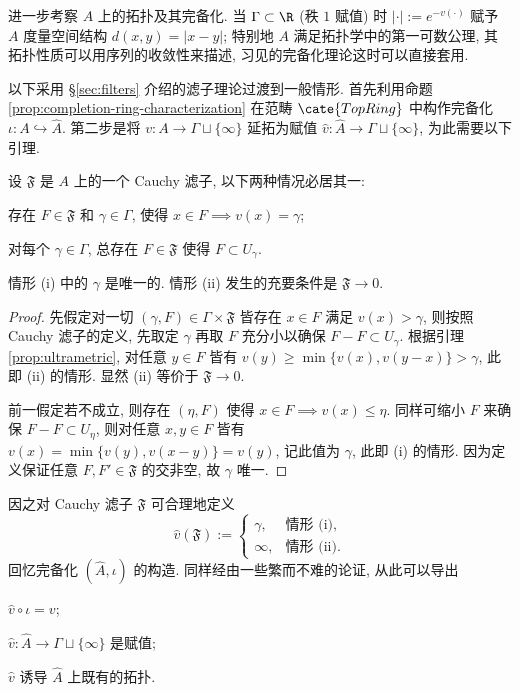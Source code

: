 进一步考察 $A$ 上的拓扑及其完备化. 当 $\Gamma \subset \R$ (秩 $1$ 赋值) 时 $|\cdot| := e^{-v(\cdot)}$ 赋予 $A$ 度量空间结构 $d(x,y) = |x-y|$; 特别地 $A$ 满足拓扑学中的第一可数公理, 其拓扑性质可以用序列的收敛性来描述, 习见的完备化理论这时可以直接套用.

以下采用 \S\ref{sec:filters} 介绍的滤子理论过渡到一般情形. 首先利用命题 \ref{prop:completion-ring-characterization} 在范畴 $\cate{TopRing}$ 中构作完备化 $\iota: A \hookrightarrow \hat{A}$. 第二步是将 $v: A \to \Gamma \sqcup \{\infty\}$ 延拓为赋值 $\hat{v}: \hat{A} \to \Gamma \sqcup \{\infty\}$, 为此需要以下引理.

\begin{lemma}\label{prop:valuation-of-Cauchy-filter}
	设 $\mathfrak{F}$ 是 $A$ 上的一个 Cauchy 滤子, 以下两种情况必居其一:
	\begin{compactenum}[(i)]
		\item 存在 $F \in \mathfrak{F}$ 和 $\gamma \in \Gamma$, 使得 $x \in F \implies v(x) = \gamma$;
		\item 对每个 $\gamma \in \Gamma$, 总存在 $F \in \mathfrak{F}$ 使得 $F \subset U_\gamma$.
	\end{compactenum}
	情形 (i) 中的 $\gamma$ 是唯一的. 情形 (ii) 发生的充要条件是 $\mathfrak{F} \to 0$.
\end{lemma}
\begin{proof}
	先假定对一切 $(\gamma, F) \in \Gamma \times \mathfrak{F}$ 皆存在 $x \in F$ 满足 $v(x) > \gamma$, 则按照 Cauchy 滤子的定义, 先取定 $\gamma$ 再取 $F$ 充分小以确保 $F-F \subset U_\gamma$. 根据引理 \ref{prop:ultrametric}, 对任意 $y \in F$ 皆有 $v(y) \geq \min\{v(x), v(y-x) \} > \gamma$, 此即 (ii) 的情形. 显然 (ii) 等价于 $\mathfrak{F} \to 0$.

	前一假定若不成立, 则存在 $(\eta, F)$ 使得 $x \in F \implies v(x) \leq \eta$. 同样可缩小 $F$ 来确保 $F-F \subset U_\eta$, 则对任意 $x,y \in F$ 皆有 $v(x) = \min\{v(y), v(x-y) \} = v(y)$, 记此值为 $\gamma$, 此即 (i) 的情形. 因为定义保证任意 $F, F' \in \mathfrak{F}$ 的交非空, 故 $\gamma$ 唯一.
\end{proof}

因之对 Cauchy 滤子 $\mathfrak{F}$ 可合理地定义
\[ \hat{v}(\mathfrak{F}) := \begin{cases}
	\gamma, & \text{情形 (i)}, \\
	\infty, & \text{情形 (ii)}.
\end{cases}\]
回忆完备化 $(\hat{A}, \iota)$ 的构造. 同样经由一些繁而不难的论证, 从此可以导出
\begin{compactitem}
	\item $\hat{v} \circ \iota = v$;
	\item $\hat{v}: \hat{A} \to \Gamma \sqcup \{\infty\}$ 是赋值;
	\item $\hat{v}$ 诱导 $\hat{A}$ 上既有的拓扑.
\end{compactitem}

